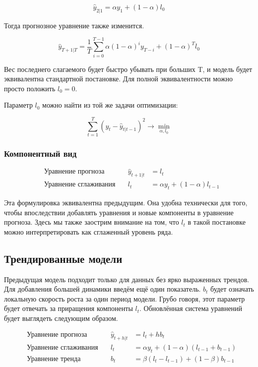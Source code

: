 \documentclass[12pt,fleqn]{article}
\begin{document}
$$
 \hat{y}_{2|1} = \alpha y_1 +(1-\alpha) l_0
$$

Тогда прогнозное уравнение также изменится.

$$
\hat{y}_{T+1|T} = \frac{1}{T}\sum_{i=0}^{T-1} \alpha (1-\alpha)^{i} y_{T-i} + (1-\alpha)^T l_0
$$

Вес последнего слагаемого будет быстро убывать при больших T, и модель будет эквивалентна стандартной постановке. Для полной эквивалентности можно просто положить $l_0 = 0$.

Параметр $l_0$ можно найти из той же задачи оптимизации:

$$
\sum_{t=1}^{T}(y_t - \hat{y}_{t|t-1})^2 \rightarrow \min_{\alpha, l_0}
$$


\subsubsection{Компонентный вид}

\[
\begin{array}{llll}
	&\text{Уравнение прогноза} \quad & 	\hat{y}_{t+1|t}& = l_t \\
	&\text{Уравнение сглаживания}\quad & l_t& =\alpha y_t +(1-\alpha) l_{t-1}
\end{array}
\]

Эта формулировка эквивалентна предыдущим. Она удобна технически для того, чтобы впоследствии добавлять уравнения и новые компоненты в уравнение прогноза. Здесь мы также заострим внимание на том, что $l_t$ в такой постановке можно интерпретировать как сглаженный уровень ряда.



\subsection{Трендированные модели}

Предыдущая модель подходит только для данных без ярко выраженных трендов.
Для добавления большей динамики введём ещё один показатель.
$b_t$ будет означать локальную скорость роста за один период модели.
Грубо говоря, этот параметр будет отвечать за приращения компоненты $l_t$. Обновлённая система уравнений будет выглядеть следующим образом.

\[
\begin{array}{llll}
		&\text{Уравнение прогноза} \quad & 	\hat{y}_{t+h|t}& = l_t + h b_t \\
		&\text{Уравнение сглаживания}\quad & l_t& =\alpha y_t +(1-\alpha)(l_{t-1} + b_{t-1}) \\
		&\text{Уравнение тренда}\quad & b_t& =\beta (l_t - l_{t-1}) +(1-\beta) b_{t-1}
\end{array}
\]
\end{document}
